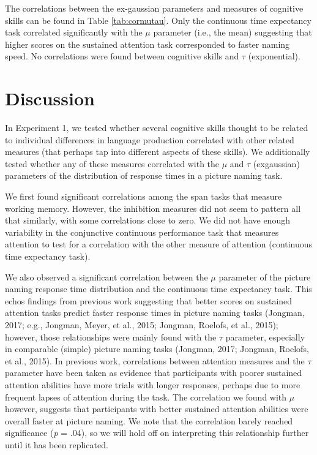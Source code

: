 \documentclass[
  man,floatsintext]{apa6}
\begin{document}
The correlations between the ex-gaussian parameters and measures of cognitive skills can be found in Table \ref{tab:cormutau}. Only the continuous time expectancy task correlated significantly with the \(\mu\) parameter (i.e., the mean) suggesting that higher scores on the sustained attention task corresponded to faster naming speed. No correlations were found between cognitive skills and \(\tau\) (exponential).

\hypertarget{discussion}{%
\section{Discussion}\label{discussion}}

In Experiment 1, we tested whether several cognitive skills thought to be related to individual differences in language production correlated with other related measures (that perhaps tap into different aspects of these skills). We additionally tested whether any of these measures correlated with the \(\mu\) and \(\tau\) (exgaussian) parameters of the distribution of response times in a picture naming task.

We first found significant correlations among the span tasks that measure working memory. However, the inhibition measures did not seem to pattern all that similarly, with some correlations close to zero. We did not have enough variability in the conjunctive continuous performance task that measures attention to test for a correlation with the other measure of attention (continuous time expectancy task).

We also observed a significant correlation between the \(\mu\) parameter of the picture naming response time distribution and the continuous time expectancy task. This echos findings from previous work suggesting that better scores on sustained attention tasks predict faster response times in picture naming tasks (Jongman, 2017; e.g., Jongman, Meyer, et al., 2015; Jongman, Roelofs, et al., 2015); however, those relationships were mainly found with the \(\tau\) parameter, especially in comparable (simple) picture naming tasks (Jongman, 2017; Jongman, Roelofs, et al., 2015). In previous work, correlations between attention measures and the \(\tau\) parameter have been taken as evidence that participants with poorer sustained attention abilities have more trials with longer responses, perhaps due to more frequent lapses of attention during the task. The correlation we found with \(\mu\) however, suggests that participants with better sustained attention abilities were overall faster at picture naming. We note that the correlation barely reached significance (\emph{p} = .04), so we will hold off on interpreting this relationship further until it has been replicated.
\end{document}
